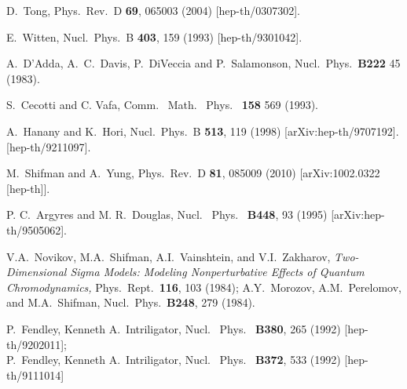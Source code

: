 \documentclass[epsfig,12pt]{article}
\newcommand{\ntwo}{${\mathcal N}=2\;$}
\begin{document}
\begin{thebibliography}{99}
D.~Tong,
Phys.\ Rev.\ D {\bf 69}, 065003 (2004)
[hep-th/0307302].

E.~Witten,
  Nucl.\ Phys.\ B {\bf 403}, 159 (1993)
  [hep-th/9301042].

A.~D'Adda, A.~C.~Davis, P.~DiVeccia and P.~Salamonson,
Nucl.\ Phys.\ {\bf B222} 45 (1983).
   
S.~Cecotti and C. Vafa,
Comm. \ Math. \ Phys. \ {\bf 158} 569 (1993).

A.~Hanany and K.~Hori,
  Nucl.\ Phys.\  B {\bf 513}, 119 (1998)
  [arXiv:hep-th/9707192].
[hep-th/9211097].

M.~Shifman and A.~Yung,
  Phys.\ Rev.\  D {\bf 81}, 085009 (2010)
  [arXiv:1002.0322 [hep-th]].

P. C.~Argyres and M. R.~Douglas,
Nucl. \ Phys. \ {\bf B448}, 93 (1995)   
[arXiv:hep-th/9505062].

  
  V.A.~Novikov, M.A.~Shifman, A.I.~Vainshtein, and V.I.~Zakharov,
 {\em Two-Dimensional Sigma Models: Modeling Nonperturbative Effects of Quantum Chromodynamics,}
  Phys.\ Rept.\  {\bf 116}, 103 (1984);  A.Y.~Morozov, A.M.~Perelomov, and M.A.~Shifman,
  Nucl.\ Phys.\  {\bf B248}, 279 (1984).
  
P.~Fendley, Kenneth A.~Intriligator, 
Nucl. \ Phys. \ {\bf B380}, 265 (1992) 
[hep-th/9202011];\\
P.~Fendley, Kenneth A.~Intriligator, 
Nucl. \ Phys. \ {\bf B372}, 533 (1992) 
[hep-th/9111014]

\end{thebibliography}
\end{document}
